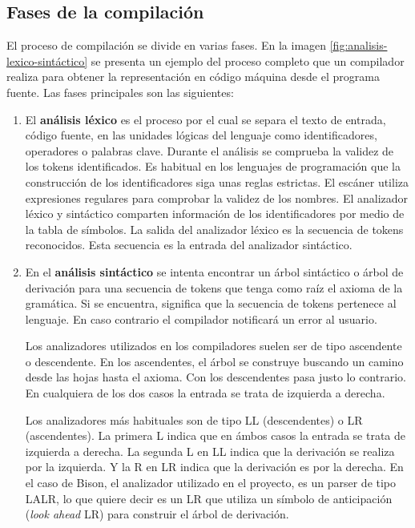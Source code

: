 \subsection{Fases de la compilación}

El proceso de compilación se divide en varias fases. En la imagen \ref{fig:analisis-lexico-sintáctico} se presenta un ejemplo del proceso completo que un compilador realiza para obtener la representación en código máquina desde el programa fuente. Las fases principales son las siguientes:

\begin{enumerate}
    \item El \textbf{análisis léxico} es el proceso por el cual se separa el texto de entrada, código fuente, en las unidades lógicas del lenguaje como identificadores, operadores o palabras clave. 
    Durante el análisis se comprueba la validez de los tokens identificados. Es habitual en los lenguajes de programación que la construcción de los identificadores siga unas reglas estrictas. El escáner utiliza expresiones regulares para comprobar la validez de los nombres.
    El analizador léxico y sintáctico comparten información de los identificadores por medio de la tabla de símbolos.
    La salida del analizador léxico es la secuencia de tokens reconocidos. Esta secuencia es la entrada del analizador sintáctico.
    
    \item En el \textbf{análisis sintáctico} se intenta encontrar un árbol sintáctico o árbol de derivación para una secuencia de tokens que tenga como raíz el axioma de la gramática. Si se encuentra, significa que la secuencia de tokens pertenece al lenguaje. En caso contrario el compilador notificará un error al usuario.
    
    Los analizadores utilizados en los compiladores suelen ser de tipo ascendente o descendente. En los ascendentes, el árbol se construye buscando un camino desde las hojas hasta el axioma. Con los descendentes pasa justo lo contrario. En cualquiera de los dos casos la entrada se trata de izquierda a derecha. 
    
    Los analizadores más habituales son de tipo LL (descendentes) o LR (ascendentes). La primera L indica que en ámbos casos la entrada se trata de izquierda a derecha. La segunda L en LL indica que la derivación se realiza por la izquierda. Y la R en LR indica que la derivación es por la derecha. En el caso de Bison, el analizador utilizado en el proyecto, es un parser de tipo LALR, lo que quiere decir es un LR que utiliza un símbolo de anticipación (\emph{look ahead} LR) para construir el árbol de derivación. 


\end{enumerate}
